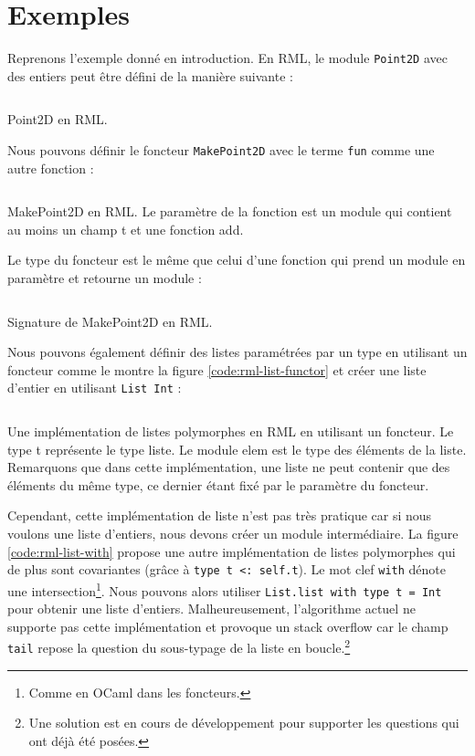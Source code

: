 \section{Exemples}

Reprenons l'exemple donné en introduction. En RML, le module \verb|Point2D| avec
des entiers peut être défini de la manière suivante :

\begin{listing}
  \inputminted{OCaml}{codes/point2d.rml}
  \caption{Point2D en RML.}
\end{listing}

Nous pouvons définir le foncteur \verb|MakePoint2D| avec le terme \verb|fun|
comme une autre fonction :

\begin{listing}
  \inputminted{OCaml}{codes/makepoint2d.rml}
  \caption{MakePoint2D en RML. Le paramètre de la fonction est un module qui
    contient au moins un champ t et une fonction add.}
  \label{code:rml-point2d}
\end{listing}

Le type du foncteur est le même que celui d'une fonction qui prend un module
en paramètre et retourne un module :

\begin{listing}
  \inputminted{OCaml}{codes/makepoint2d_sig.rml}
  \caption{Signature de MakePoint2D en RML.}
  \label{code:rml-makepoint2d}
\end{listing}

Nous pouvons également définir des listes paramétrées par un type en utilisant un foncteur
comme le montre la figure \ref{code:rml-list-functor} et créer une liste d'entier en
utilisant \verb|List Int| :

\begin{listing}
  \inputminted{OCaml}{codes/list_functor.rml}
  \caption{Une implémentation de listes polymorphes en RML en utilisant un
    foncteur. Le type t représente le type liste. Le module elem
    est le type des éléments de la liste. Remarquons que dans cette
    implémentation, une liste ne peut contenir que des éléments du même type, ce
    dernier étant fixé par le paramètre du foncteur.}
  \label{code:rml-list-functor}
\end{listing}

Cependant, cette implémentation de liste n'est pas très pratique car si nous
voulons une liste d'entiers, nous devons créer un module intermédiaire. La figure
\ref{code:rml-list-with} propose une autre implémentation de listes polymorphes
qui de plus sont covariantes (grâce à \verb|type t <: self.t|). Le mot clef
\verb|with| dénote une intersection\footnote{Comme en OCaml dans
  les foncteurs.}. Nous pouvons alors utiliser \verb|List.list with type t = Int|
pour obtenir une liste d'entiers. Malheureusement, l'algorithme actuel ne
supporte pas cette implémentation et provoque un stack overflow car le champ
\verb|tail| repose la question du sous-typage de la liste en
boucle.\footnote{Une solution est en cours de développement pour supporter les
  questions qui ont déjà été posées.}

